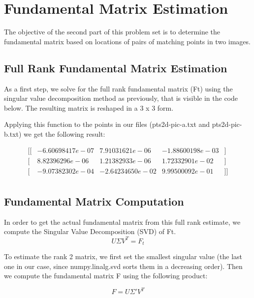 \documentclass[a4paper,11pt]{article}
\begin{document}
\section{Fundamental Matrix Estimation}


The objective of the second part of this problem set is to determine the fundamental matrix based on locations of pairs of matching points in two images.

\subsection{Full Rank Fundamental Matrix Estimation}

As a first step, we solve for the full rank fundamental matrix (Ft) using the singular value decomposition method as previously, that is visible in the code below.
The resulting matrix is reshaped in a 3 x 3 form.

\lstset{style=mystyle}


Applying this function to the points in our files (pts2d-pic-a.txt and pts2d-pic-b.txt) we get the following result:

$$
\begin{matrix}
[ [ &-6.60698417e-07 & 7.91031621e-06  & -1.88600198e-03 & ]\\
 [ & 8.82396296e-06 & 1.21382933e-06 &  1.72332901e-02  &]\\
 [ & -9.07382302e-04 & -2.64234650e-02  & 9.99500092e-01 &]] \\
\end{matrix}
$$

\subsection{Fundamental Matrix Computation}


In order to get the actual fundamental matrix from this full rank estimate, we compute the Singular Value Decomposition (SVD) of Ft.
$$U\Sigma V^{T} = F_{t}$$


To estimate the rank 2 matrix, we first set the smallest singular value (the last one in our case, since numpy.linalg.svd sorts them in a decreasing order). Then we compute the fundamental matrix F using the following product:

$$F = U\Sigma ' V^{T}$$
\end{document}
